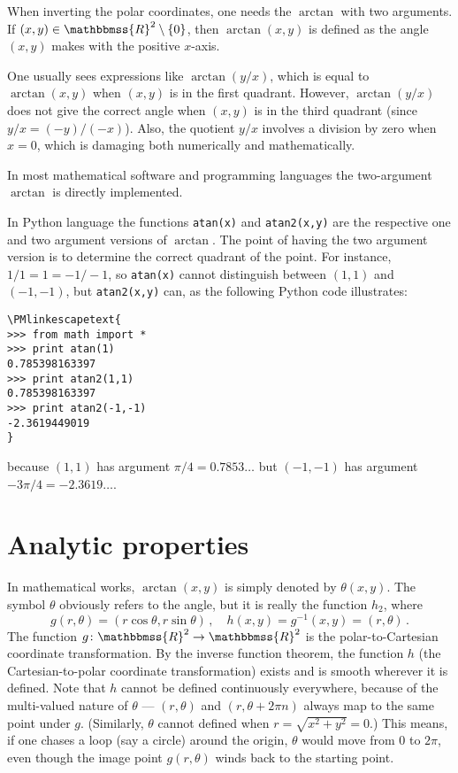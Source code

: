 \documentclass[12pt]{article}
\newcommand{\R}{\mathbbmss{R}}
\begin{document}
When inverting the polar coordinates, one needs the 
 $\arctan$
with two arguments.
If $(x,y)\in \R^2\setminus\{0\}$, then 
$
  \arctan(x,y)
$
is defined as the angle $(x,y)$ makes with 
the positive $x$-axis. 

One usually sees expressions like $\arctan(y/x)$,
which is equal to $\arctan(x,y)$ when $(x,y)$ is in the first quadrant.
However, $\arctan(y/x)$ does not give the correct angle when $(x,y)$
is in the third quadrant (since $y/x=(-y)/(-x)$).
Also, the quotient $y/x$ involves a division by zero when $x=0$,
which is damaging both numerically and mathematically.

In most mathematical software and programming languages the two-argument $\arctan$
is directly implemented.

In Python language the functions \texttt{atan(x)} and \texttt{atan2(x,y)} are the respective one and two argument versions of $\arctan$. The point of having the two argument version is to determine the correct quadrant of the point. For instance, $1/1 = 1 = -1/-1$, so \texttt{atan(x)} cannot distinguish between $(1,1)$ and $(-1,-1)$, but \texttt{atan2(x,y)} can, as the following Python code illustrates:
\begin{verbatim}
\PMlinkescapetext{
>>> from math import *
>>> print atan(1)
0.785398163397
>>> print atan2(1,1)
0.785398163397
>>> print atan2(-1,-1)
-2.3619449019
}
\end{verbatim}
because $(1,1)$ has argument $\pi/4=0.7853\ldots$ but $(-1,-1)$ has argument $-3\pi/4=-2.3619\ldots$.

\section*{Analytic properties}
In mathematical works, $\arctan(x,y)$
is simply denoted by $\theta(x, y)$.  The symbol $\theta$ obviously refers to the angle, but it is really
the function $h_2$, where
\[
g(r, \theta) = (r \cos \theta, r \sin \theta)\,, \quad h(x,y) = g^{-1}(x, y) = (r, \theta)\,.
\]
The function $g \colon \R^2 \to \R^2$ is the polar-to-Cartesian coordinate transformation.
By the inverse function theorem, the function $h$ (the Cartesian-to-polar coordinate transformation) exists and is smooth wherever it is defined. 
Note that $h$ cannot be defined continuously everywhere, because of the multi-valued nature of $\theta$ --- $(r, \theta)$ and $(r, \theta + 2\pi n)$ always map to the same point under $g$.
(Similarly, $\theta$ cannot defined when $r = \sqrt{x^2 + y^2} = 0$.)
This means, if one chases a loop (say a circle) around the origin, $\theta$ would move
from $0$ to $2\pi$, even though the image point $g(r, \theta)$ winds back to the starting point.
\end{document}
